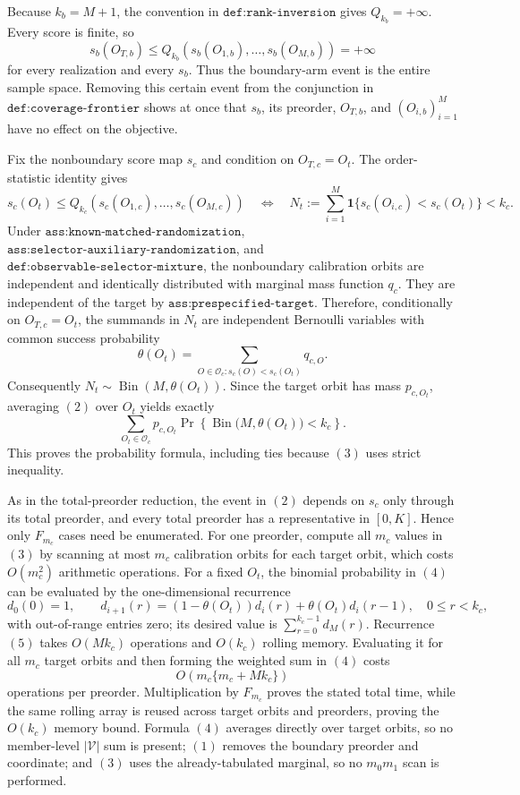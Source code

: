 Because \(k_b=M+1\), the convention in \(\texttt{def:rank-inversion}\) gives \(Q_{k_b}=+\infty\). Every score is finite, so
\[
s_b(O_{T,b})\le Q_{k_b}(s_b(O_{1,b}),\ldots,s_b(O_{M,b}))=+\infty
\tag{1}
\]
for every realization and every \(s_b\). Thus the boundary-arm event is the entire sample space. Removing this certain event from the conjunction in \(\texttt{def:coverage-frontier}\) shows at once that \(s_b\), its preorder, \(O_{T,b}\), and \((O_{i,b})_{i=1}^M\) have no effect on the objective.

Fix the nonboundary score map \(s_c\) and condition on \(O_{T,c}=O_t\). The order-statistic identity gives
\[
s_c(O_t)\le Q_{k_c}(s_c(O_{1,c}),\ldots,s_c(O_{M,c}))
\quad\Longleftrightarrow\quad
N_t:=\sum_{i=1}^M\mathbf 1\{s_c(O_{i,c})<s_c(O_t)\}<k_c.
\tag{2}
\]
Under \(\texttt{ass:known-matched-randomization}\), \(\texttt{ass:selector-auxiliary-randomization}\), and \(\texttt{def:observable-selector-mixture}\), the nonboundary calibration orbits are independent and identically distributed with marginal mass function \(q_c\). They are independent of the target by \(\texttt{ass:prespecified-target}\). Therefore, conditionally on \(O_{T,c}=O_t\), the summands in \(N_t\) are independent Bernoulli variables with common success probability
\[
\theta(O_t)=\sum_{O\in\mathcal O_c:s_c(O)<s_c(O_t)}q_{c,O}.
\tag{3}
\]
Consequently \(N_t\sim\operatorname{Bin}(M,\theta(O_t))\). Since the target orbit has mass \(p_{c,O_t}\), averaging \((2)\) over \(O_t\) yields exactly
\[
\sum_{O_t\in\mathcal O_c}p_{c,O_t}
\Pr\!\left\{\operatorname{Bin}\bigl(M,\theta(O_t)\bigr)<k_c\right\}.
\tag{4}
\]
This proves the probability formula, including ties because \((3)\) uses strict inequality.

As in the total-preorder reduction, the event in \((2)\) depends on \(s_c\) only through its total preorder, and every total preorder has a representative in \([0,K]\). Hence only \(F_{m_c}\) cases need be enumerated. For one preorder, compute all \(m_c\) values in \((3)\) by scanning at most \(m_c\) calibration orbits for each target orbit, which costs \(O(m_c^2)\) arithmetic operations. For a fixed \(O_t\), the binomial probability in \((4)\) can be evaluated by the one-dimensional recurrence
\[
d_0(0)=1,\qquad
d_{i+1}(r)=(1-\theta(O_t))d_i(r)+\theta(O_t)d_i(r-1),
\quad 0\le r<k_c,
\tag{5}
\]
with out-of-range entries zero; its desired value is \(\sum_{r=0}^{k_c-1}d_M(r)\). Recurrence \((5)\) takes \(O(Mk_c)\) operations and \(O(k_c)\) rolling memory. Evaluating it for all \(m_c\) target orbits and then forming the weighted sum in \((4)\) costs
\[
O\!\left(m_c\{m_c+Mk_c\}\right)
\]
operations per preorder. Multiplication by \(F_{m_c}\) proves the stated total time, while the same rolling array is reused across target orbits and preorders, proving the \(O(k_c)\) memory bound. Formula \((4)\) averages directly over target orbits, so no member-level \(|\mathcal V|\) sum is present; \((1)\) removes the boundary preorder and coordinate; and \((3)\) uses the already-tabulated marginal, so no \(m_0m_1\) scan is performed.